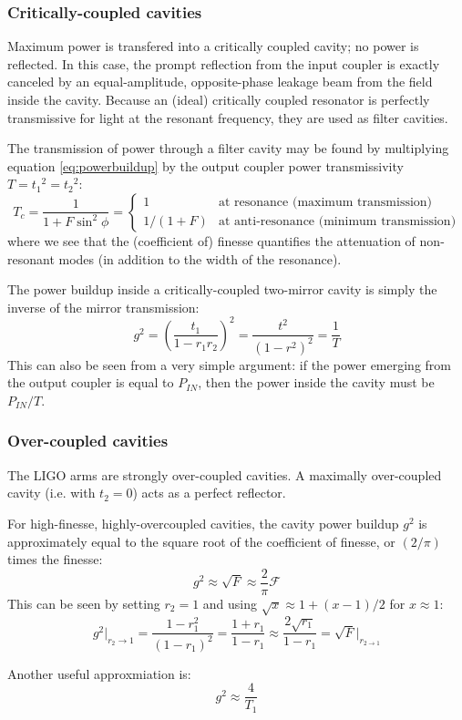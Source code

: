 \subsubsection{Critically-coupled cavities}

Maximum power is transfered into a critically coupled cavity; no power
is reflected. In this case, the prompt reflection from the input coupler
is exactly canceled by an equal-amplitude, opposite-phase leakage
beam from the field inside the cavity. Because an (ideal) critically
coupled resonator is perfectly transmissive for light at the resonant
frequency, they are used as filter cavities.

The transmission of power through a filter cavity may be found by
multiplying equation \ref{eq:powerbuildup} by the output coupler
power transmissivity $T={t_{1}}^{2}={t_{2}}^{2}$: 
\begin{equation}
T_{c}=\frac{1}{1+F\sin^{2}\phi}=\begin{cases}
1 & \text{at resonance (maximum transmission)}\\
1/(1+F) & \text{at anti-resonance (minimum transmission)}
\end{cases}
\end{equation}
where we see that the (coefficient of) finesse quantifies the attenuation
of non-resonant modes (in addition to the width of the resonance).

The power buildup inside a critically-coupled two-mirror cavity is
simply the inverse of the mirror transmission:
\[
g^{2}=\left(\frac{t_{1}}{1-r_{1}r_{2}}\right)^{2}=\frac{t^{2}}{\left(1-r^{2}\right)^{2}}=\frac{1}{T}
\]
This can also be seen from a very simple argument: if the power emerging
from the output coupler is equal to $P_{IN}$, then the power inside
the cavity must be $P_{IN}/T$.


\subsubsection{Over-coupled cavities}

The LIGO arms are strongly over-coupled cavities. A maximally over-coupled
cavity (i.e. with $t_{2}=0$) acts as a perfect reflector. 

For high-finesse, highly-overcoupled cavities, the cavity power buildup
$g^{2}$ is approximately equal to the square root of the coefficient
of finesse, or $(2/\pi)$ times the finesse:
\begin{equation}
g^{2}\approx\sqrt{F}\approx\frac{2}{\pi}\mathcal{F}
\end{equation}
This can be seen by setting $r_{2}=1$ and using $\sqrt{x}\approx1+(x-1)/2$
for $x\approx1$:
\begin{equation}
g^{2}\bigg|_{r_{2}\to1}=\frac{1-r_{1}^{2}}{\left(1-r_{1}\right)^{2}}=\frac{1+r_{1}}{1-r_{1}}\approx\frac{2\sqrt{r_{1}}}{1-r_{1}}=\sqrt{F}\bigg|_{r_{2\to1}}
\end{equation}


Another useful approxmiation is:
\[
g^{2}\approx\frac{4}{T_{1}}
\]

